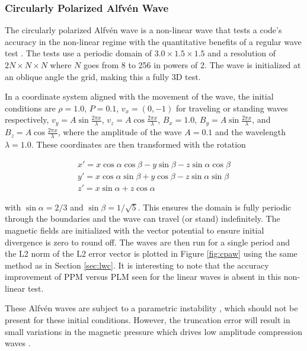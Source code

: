 \subsubsection{Circularly Polarized Alfv\'en Wave}
\label{sec:cpaw}

The circularly polarized Alfv\'en wave is a non-linear wave that tests a code's accuracy in the non-linear regime with the quantitative benefits of a regular wave test \citep{Toth1996}. The tests use a periodic domain of $3.0\times1.5\times1.5$ and a resolution of $2N\times N \times N$ where $N$ goes from 8 to 256 in powers of 2. The wave is initialized at an oblique angle the grid, making this a fully 3D test.

In a coordinate system aligned with the movement of the wave, the initial conditions are 
$\rho = 1.0$,
$P = 0.1$,
$v_x = (0,-1)$ for traveling or standing waves respectively,
$v_y = A \sin{\frac{2\pi x}{\lambda}}$,
$v_z = A \cos{\frac{2\pi x}{\lambda}}$,
$B_x = 1.0$,
$B_y = A \sin{\frac{2\pi x}{\lambda}}$,
and $B_z = A \cos{\frac{2\pi x}{\lambda}}$,
where the amplitude of the wave $A = 0.1$ and the wavelength $\lambda = 1.0$. These coordinates are then transformed with the rotation

\begin{eqnarray}
    x\prime = x \cos\alpha\cos\beta - y \sin\beta - z \sin\alpha\cos\beta \nonumber \\
    y\prime = x \cos\alpha\sin\beta + y \cos\beta - z \sin\alpha\sin\beta \nonumber \\
    z\prime = x \sin\alpha + z \cos\alpha \nonumber
\end{eqnarray}

\noindent with $\sin\alpha = 2/3$ and $\sin\beta = 1/\sqrt{5}$. This ensures the domain is fully periodic through the boundaries and the wave can travel (or stand) indefinitely. The magnetic fields are initialized with the vector potential to ensure initial divergence is zero to round off. The waves are then run for a single period and the L2 norm of the L2 error vector is plotted in Figure \ref{fig:cpaw} using the same method as in Section \ref{sec:lwc}. It is interesting to note that the accuracy improvement of PPM versus PLM seen for the linear waves is absent in this non-linear test.

These Alfv\'en waves are subject to a parametric instability \citep{del_zanna_parametric_2001}, which should not be present for these initial conditions. However, the truncation error will result in small variations in the magnetic pressure which drives low amplitude compression waves \citep{stone_athena_2008}. 

